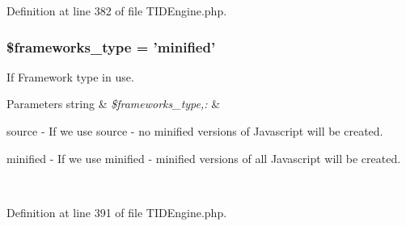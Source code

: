 Definition at line 382 of file TIDEngine.php.

\hypertarget{group__js__cache__settings_ga74a35165f016f24e125268a1e122c14f}{
\subsubsection[{\$frameworks\_\-type}]{\setlength{\rightskip}{0pt plus 5cm}\$frameworks\_\-type = 'minified'}}
\label{group__js__cache__settings_ga74a35165f016f24e125268a1e122c14f}
If Framework type in use.


\begin{DoxyParams}[1]{Parameters}
string & {\em \$frameworks\_\-type,:} & 
\begin{DoxyItemize}
\item source -\/ If we use source -\/ no minified versions of Javascript will be created.
\item minified -\/ If we use minified -\/ minified versions of all Javascript will be created. 
\end{DoxyItemize}\\
\hline
\end{DoxyParams}


Definition at line 391 of file TIDEngine.php.

